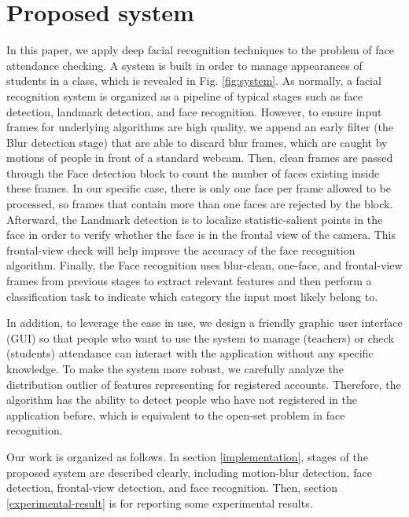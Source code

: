 \documentclass[journal, twocolumn]{IEEEtran}
\begin{document}
\medskip
\section{Proposed system}
\label{proposed-system}

In this paper, we apply deep facial recognition techniques to the problem of face attendance checking. A system is built in order to manage appearances of students in a class, which is revealed in Fig. \ref{fig:system}. As normally, a facial recognition system is organized as a pipeline of typical stages such as face detection, landmark detection, and face recognition. However, to ensure input frames for underlying algorithms are high quality, we append an early filter (the Blur detection stage) that are able to discard blur frames, which are caught by motions of people in front of a standard webcam. Then, clean frames are passed through the Face detection block to count the number of faces existing inside these frames. In our specific case, there is only one face per frame allowed to be processed, so frames that contain more than one faces are rejected by the block. Afterward, the Landmark detection is to localize statistic-salient points in the face in order to verify whether the face is in the frontal view of the camera. This frontal-view check will help improve the accuracy of the face recognition algorithm. Finally, the Face recognition uses blur-clean, one-face, and frontal-view frames from previous stages to extract relevant features and then perform a classification task to indicate which category the input most likely belong to.

In addition, to leverage the ease in use, we design a friendly graphic user interface (GUI) so that people who want to use the system to manage (teachers) or check (students) attendance can interact with the application without any specific knowledge. To make the system more robust, we carefully analyze the distribution outlier of features representing for registered accounts. Therefore, the algorithm has the ability to detect people who have not registered in the application before, which is equivalent to the open-set problem in face recognition.

Our work is organized as follows. In section \ref{implementation}, stages of the proposed system are described clearly, including motion-blur detection, face detection, frontal-view detection, and face recognition. Then, section \ref{experimental-result} is for reporting some experimental results.
\end{document}
